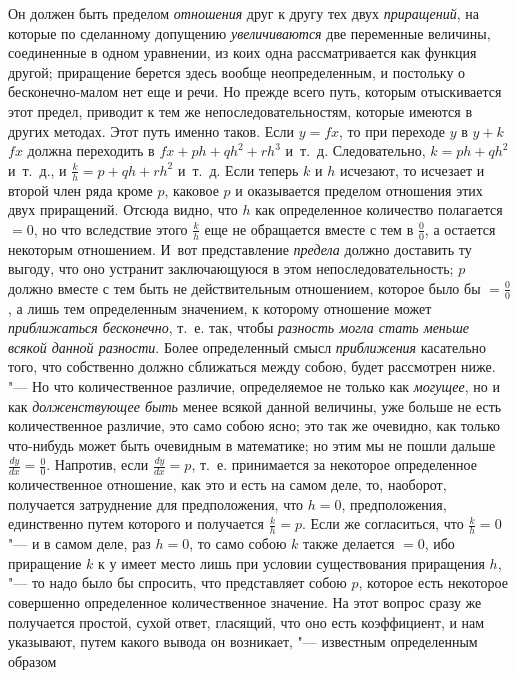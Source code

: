 Он должен быть пределом {\em отношения} друг к другу тех
двух {\em приращений}, на которые по сделанному
допущению {\em увеличиваются} две переменные величины,
соединенные в одном уравнении, из коих одна рассматривается как функция
другой; приращение берется здесь вообще неопределенным, и постольку о
бесконечно-малом нет еще и речи. Но прежде всего путь, которым отыскивается
этот предел, приводит к тем же непоследовательностям, которые имеются в
других методах. Этот путь именно таков. Если $y=fx$, то при
переходе $y$ в $y+k$ $fx$
должна переходить в $fx+ph+qh^2+rh^3$ и~т.~д.
Следовательно, $k=ph+qh^2$ и~т.~д., и
$\frac k h = p + qh + rh^2$ и~т.~д. Если теперь $k$ и
$h$ исчезают, то исчезает и второй член ряда кроме
$p$, каковое $p$ и
оказывается пределом отношения этих двух приращений. Отсюда видно, что
$h$ как определенное количество полагается
$= 0$, но что вследствие
этого $\frac k h$ еще не обращается вместе с тем в $\frac 0 0$, а
остается некоторым отношением. И~вот представление
{\em предела} должно доставить ту выгоду, что оно
устранит заключающуюся в этом непоследовательность;
$p$ должно вместе с тем быть не действительным
отношением, которое было бы $=\frac 0 0$, а лишь тем определенным
значением, к которому отношение может {\em приближаться
бесконечно}, т.~е. так, чтобы {\em разность могла стать
меньше всякой данной разности}. Более определенный смысл
{\em приближения} касательно того, что собственно
должно сближаться между собою, будет рассмотрен ниже. "--- Но что
количественное различие, определяемое не только как
{\em могущее}, но и как
{\em долженствующее быть} менее всякой данной величины,
уже больше не есть количественное различие, это само собою ясно; это так же
очевидно, как только что-нибудь может быть очевидным в математике; но этим
мы не пошли дальше $\frac{dy}{dx}=\frac 0 0$. Напротив,
если $\frac{dy}{dx} = p$, т.~е. принимается за некоторое
определенное количественное отношение, как это и есть на самом деле, то,
наоборот, получается затруднение для предположения, что $h=0$,
предположения, единственно путем которого и получается $\frac k h = p$.
Если же согласиться, что $\frac k h = 0$ "--- и в самом деле,
раз $h=0$, то само собою $k$ также делается $=0$, ибо
приращение $k$ к $у$ имеет
место лишь при условии существования приращения
$h$, "--- то надо было бы спросить, что представляет
собою $p$, которое есть некоторое совершенно
определенное количественное значение. На этот вопрос сразу же получается
простой, сухой ответ, гласящий, что оно есть коэффициент, и нам указывают,
путем какого вывода он возникает, "--- известным определенным образом
